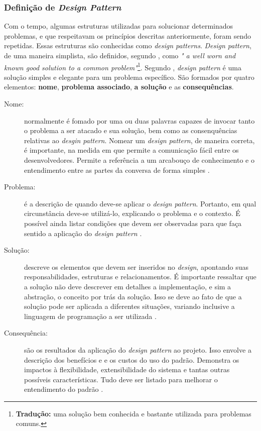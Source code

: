 \subsubsection{Definição de \textit{Design Pattern}} 
Com o tempo, algumas estruturas utilizadas para solucionar determinados problemas, e que respeitavam os princípios descritas anteriormente, foram sendo repetidas. Essas estruturas são conhecidas como  \textit{design patterns}. \textit{Design pattern}, de uma maneira simplista, são definidos, segundo , como \textit{" a well worn and known good solution to
a common problem"}\footnote{\textbf{Tradução:} uma solução bem conhecida e bastante utilizada para problemas comuns.}. Segundo , \textit{design pattern} é uma solução simples e elegante para um problema específico. São formados por quatro elementos: \textbf{nome}, \textbf{problema associado}, \textbf{a solução} e as \textbf{consequências}.
\begin{description}
\item[Nome:] normalmente é fomado por uma ou duas palavras capazes de invocar tanto o problema a ser atacado e sua solução, bem como as consenquências relativas ao \textit{desgin pattern}. Nomear um \textit{design pattern}, de maneira correta, é importante, na medida em que permite a comunicação fácil entre os desenvolvedores. Permite a referência a um arcabouço de conhecimento e o entendimento entre as partes da conversa de forma simples \cite{martin2000}.
\item[Problema:] é a descrição de quando deve-se aplicar o \textit{design pattern}. Portanto, em qual circunstância deve-se utilizá-lo, explicando o problema e o contexto. É possível ainda listar condições que devem ser observadas para que faça sentido a aplicação do \textit{design pattern} \cite{martin2000}.
\item[Solução:] descreve os elementos que devem ser inseridos no \textit{design}, apontando suas responsabilidades, estruturas e relacionamentos. É importante ressaltar que a solução não deve descrever em detalhes a implementação, e sim a abstração, o conceito por trás da solução. Isso se deve ao fato de que a solução pode ser aplicada a diferentes situações, variando inclusive a linguagem de programação a ser utilizada \cite{martin2000}.
\item[Consequência:] são os resultados da aplicação do \textit{design pattern} ao projeto. Isso envolve a descrição dos benefícios e e os custos do uso do padrão. Demonstra os impactos à flexibilidade, extensibilidade do sistema e tantas outras possíveis características. Tudo deve ser listado para melhorar o entendimento do padrão \cite{martin2000}.
\end{description}
\par
